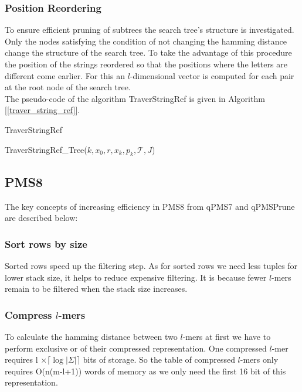 {\subsubsection{Position Reordering}
To ensure efficient pruning of subtrees the search tree's structure is investigated. Only the nodes satisfying the condition of not changing the hamming distance change the structure of the search tree. To take the advantage of this procedure the position of the strings reordered so that the positions where the letters are different come earlier. For this an $l$-dimensional vector is computed for each pair at the root node of the search tree.\\


The pseudo-code of the algorithm TraverStringRef is given in Algorithm [\cref{traver_string_ref}].

\begin{algorithm}[H]
	\caption{TraverStringRef}
	\label{traver_string_ref}
	\begin{algorithmic}[1]
		
	\end{algorithmic}
\end{algorithm}

\begin{algorithm}[H]
	\caption{TraverStringRef\_Tree($k,x_0,r,x_k,p_k,\mathcal{T},J$)}
	\label{traver_string_ref_tree}
	\begin{algorithmic}[1]
		
	\end{algorithmic}
\end{algorithm}

\subsection{PMS8}
The key concepts of increasing efficiency in PMS8 from qPMS7 and qPMSPrune are described below:

\subsubsection{Sort rows by size}
Sorted rows speed up the filtering step. As for sorted rows we need less tuples for lower stack size, it helps to reduce expensive filtering. It is because fewer $l$-mers remain to be filtered when the stack size increases.

\subsubsection{Compress $l$-mers}
To calculate the hamming distance between two $l$-mers at first we have to perform exclusive or of their compressed representation. One compressed $l$-mer requires l $\times \lceil\log|\varSigma|\rceil$ bits of storage. So the table of compressed $l$-mers only requires O(n(m-l+1)) words of memory as we only need the first 16 bit of this representation.

}
